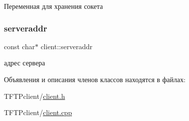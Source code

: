 Переменная для хранения сокета 

\mbox{\label{classclient_a0e6ff51f62b6a053856cbdbe48408998}} 
\subsubsection{\texorpdfstring{serveraddr}{serveraddr}}
{\footnotesize\ttfamily const char$\ast$ client\+::serveraddr\hspace{0.3cm}{\ttfamily [private]}}



адрес сервера 



Объявления и описания членов классов находятся в файлах\+:\begin{DoxyCompactItemize}
\item 
T\+F\+T\+Pclient/\mbox{\hyperlink{client_8h}{client.\+h}}\item 
T\+F\+T\+Pclient/\mbox{\hyperlink{client_8cpp}{client.\+cpp}}\end{DoxyCompactItemize}
